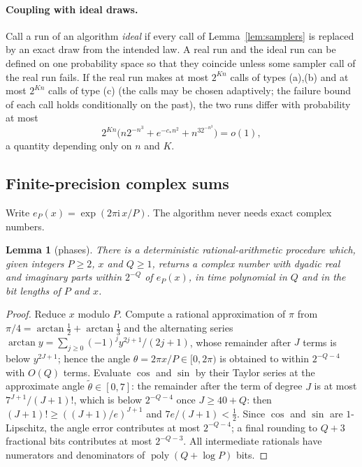 \documentclass[11pt]{article}
\newtheorem{lemma}{Lemma}[section]
\theoremstyle{definition}
\newcommand{\poly}{\operatorname{poly}}
\begin{document}
\paragraph{Coupling with ideal draws.} Call a run of an algorithm \emph{ideal} if every call of
Lemma~\ref{lem:samplers} is replaced by an exact draw from the intended law. A real run and the ideal run can be
defined on one probability space so that they coincide unless some sampler call of the real run fails. If the real
run makes at most $2^{Kn}$ calls of types (a),(b) and at most $2^{Kn}$ calls of type (c) (the calls may be chosen
adaptively; the failure bound of each call holds conditionally on the past), the two runs differ with probability at
most
\begin{equation}\label{eq:couple}
 2^{Kn}\bigl(n2^{-n^3}+e^{-c_\ast n^2}+n^32^{-n^3}\bigr)=o(1),
\end{equation}
a quantity depending only on $n$ and $K$.

\subsection{Finite-precision complex sums}\label{sec:precision}
Write $e_P(x)=\exp(2\pi\mathrm i\,x/P)$. The algorithm never needs exact complex numbers.

\begin{lemma}[phases]\label{lem:phase}
There is a deterministic rational-arithmetic procedure which, given integers $P\ge2$, $x$ and $Q\ge1$, returns a
complex number with dyadic real and imaginary parts within $2^{-Q}$ of $e_P(x)$, in time polynomial in $Q$ and in the
bit lengths of $P$ and $x$.
\end{lemma}
\begin{proof}
Reduce $x$ modulo $P$. Compute a rational approximation of $\pi$ from
$\pi/4=\arctan\tfrac12+\arctan\tfrac13$ and the alternating series $\arctan y=\sum_{j\ge0}(-1)^jy^{2j+1}/(2j+1)$,
whose remainder after $J$ terms is below $y^{2J+1}$; hence the angle $\theta=2\pi x/P\in[0,2\pi)$ is obtained to
within $2^{-Q-4}$ with $O(Q)$ terms. Evaluate $\cos$ and $\sin$ by their Taylor series at the approximate angle
$\tilde\theta\in[0,7]$: the remainder after the term of degree $J$ is at most $7^{J+1}/(J+1)!$, which is below
$2^{-Q-4}$ once $J\ge 40+Q$: then $(J+1)!\ge((J+1)/e)^{J+1}$ and $7e/(J+1)<\tfrac12$. Since $\cos$ and $\sin$ are $1$-Lipschitz, the angle error contributes
at most $2^{-Q-4}$; a final rounding to $Q+3$ fractional bits contributes at most $2^{-Q-3}$. All intermediate
rationals have numerators and denominators of $\poly(Q+\log P)$ bits.
\end{proof}
\end{document}
